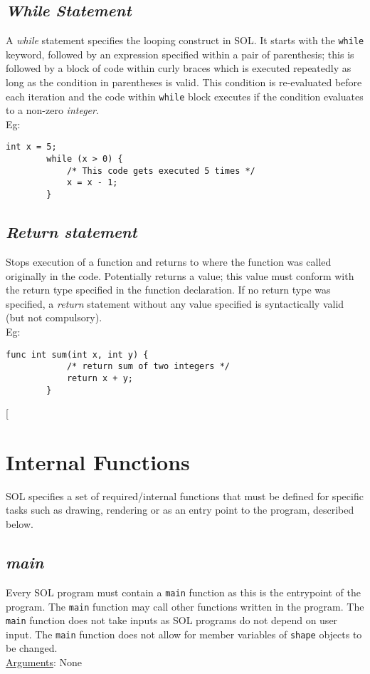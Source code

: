 \documentclass[letterpaper,12pt]{article}
\begin{document}
\subsection{\textit{While Statement}}
A \textit{while} statement specifies the looping construct in SOL. It starts with the \texttt{while} keyword, followed by an expression specified within a pair of parenthesis; this is followed by a block of code within curly braces which is executed repeatedly as long as the condition in parentheses is valid. This condition is re-evaluated before each iteration and the code within \texttt{while} block executes if the condition evaluates to a non-zero \textit{integer}. \\
Eg: \begin{lstlisting}[aboveskip=-13pt]
        int x = 5;
        while (x > 0) {
            /* This code gets executed 5 times */
            x = x - 1;
        }
    \end{lstlisting}

\subsection{\textit{Return statement}}
Stops execution of a function and returns to where the function was called originally in the code. Potentially returns a value; this value must conform with the return type specified in the function declaration. If no return type was specified, a \textit{return} statement without any value specified is syntactically valid (but not compulsory).\\
Eg: \begin{lstlisting}[aboveskip=-13pt]
        func int sum(int x, int y) {
            /* return sum of two integers */
            return x + y;
        }
    \end{lstlisting}[
    
    \section{Internal Functions} \label{internal}
    SOL specifies a set of required/internal functions that must be defined for specific tasks such as drawing, rendering or as an entry point to the program, described below.
    
    \subsection{\textit{main}}
    Every SOL program must contain a \texttt{main} function as this is the entrypoint of the program. The \texttt{main} function may call other functions written in the program. The \texttt{main} function does not take inputs as SOL programs do not depend on user input. The \texttt{main} function does not allow for member variables of \texttt{shape} objects to be changed.\\
    \underline{Arguments}: None
    
\end{document}
